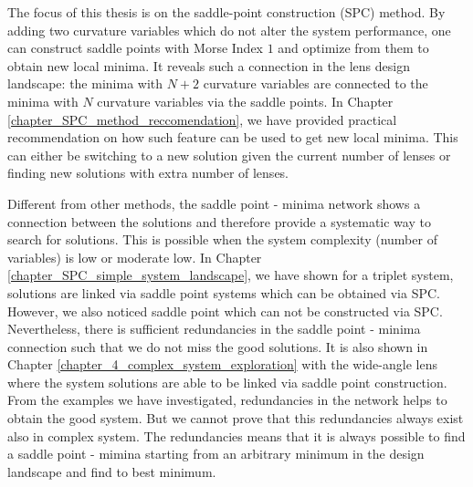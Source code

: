 The focus of this thesis is on the saddle-point construction (SPC) method. By adding two curvature variables which do not alter the system performance, one can construct saddle points with Morse Index $1$ and optimize from them to obtain new local minima. It reveals such a connection in the lens design landscape: the minima with $N+2$ curvature variables are connected to the minima with $N$ curvature variables via the saddle points. In Chapter \ref{chapter_SPC_method_reccomendation}, we have provided practical recommendation on how such feature can be used to get new local minima. This can either be switching to a new solution given the current number of lenses or finding new solutions with extra number of lenses.  

Different from other methods, the saddle point - minima network shows a connection between the solutions and therefore provide a systematic way to search for solutions. This is possible when the system complexity (number of variables) is low or moderate low. In Chapter \ref{chapter_SPC_simple_system_landscape}, we have shown for a triplet system, solutions are linked via saddle point systems which can be obtained via SPC. However, we also noticed saddle point which can not be constructed via SPC. Nevertheless, there is sufficient redundancies in the saddle point - minima connection such that we do not miss the good solutions. It is also shown in Chapter \ref{chapter_4_complex_system_exploration} with the wide-angle lens where the system solutions are able to be linked via saddle point construction. From the examples we have investigated, redundancies in the network helps to obtain the good system. But we cannot prove that this redundancies always exist also in complex system. The redundancies means that it is always possible to find a saddle point - mimina starting from an arbitrary minimum in the design landscape and find to best minimum. 

